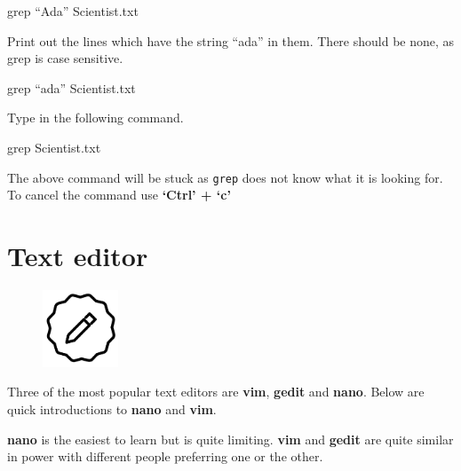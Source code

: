 \documentclass[
  letterpaper,
  DIV=11,
  numbers=noendperiod]{scrreprt}
\newenvironment{Shaded}{\begin{snugshade}}{\end{snugshade}}
\newcommand{\FunctionTok}[1]{\textcolor[rgb]{0.28,0.35,0.67}{#1}}
\newcommand{\NormalTok}[1]{\textcolor[rgb]{0.00,0.23,0.31}{#1}}
\begin{document}
\begin{Shaded}
\begin{Highlighting}[]
\FunctionTok{grep}\NormalTok{ “Ada” Scientist.txt}
\end{Highlighting}
\end{Shaded}

Print out the lines which have the string ``ada'' in them. There should
be none, as grep is case sensitive.

\begin{Shaded}
\begin{Highlighting}[]
\FunctionTok{grep}\NormalTok{ “ada” Scientist.txt}
\end{Highlighting}
\end{Shaded}

Type in the following command.

\begin{Shaded}
\begin{Highlighting}[]
\FunctionTok{grep}\NormalTok{ Scientist.txt}
\end{Highlighting}
\end{Shaded}

The above command will be stuck as \texttt{grep} does not know what it
is looking for. To cancel the command use \textbf{`Ctrl' + `c'}

\hypertarget{text-editor}{%
\section{Text editor}\label{text-editor}}

\begin{figure}

{\centering \includegraphics[width=0.2\textwidth,height=\textheight]{figures/text_editor.png}

}

\end{figure}

Three of the most popular text editors are \textbf{vim}, \textbf{gedit}
and \textbf{nano}. Below are quick introductions to \textbf{nano} and
\textbf{vim}.

\textbf{nano} is the easiest to learn but is quite limiting.
\textbf{vim} and \textbf{gedit} are quite similar in power with
different people preferring one or the other.
\end{document}
